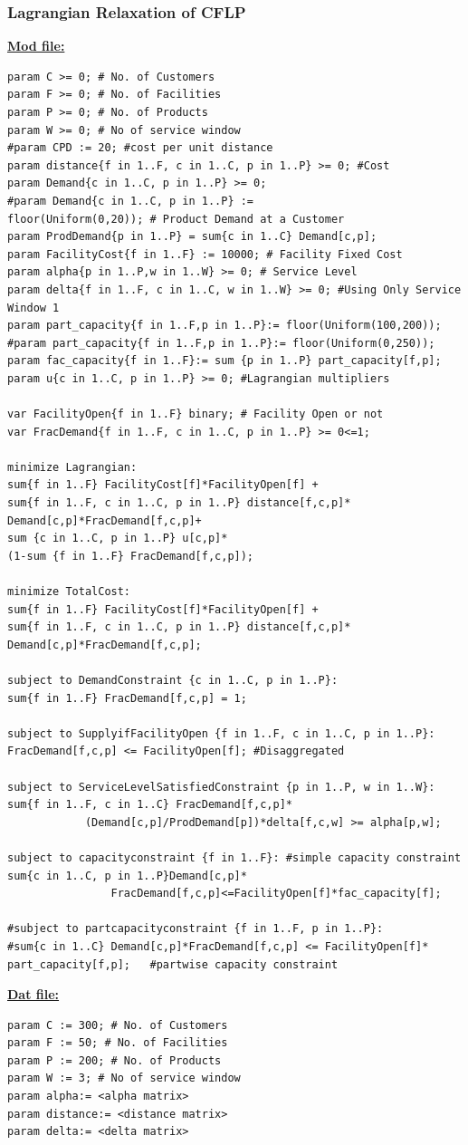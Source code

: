 \documentclass[12pt]{article}
\numberwithin{equation}{section}
\begin{document}
\subsubsection{Lagrangian Relaxation of CFLP}
\textbf{\underline{Mod file:}}
\begin{verbatim}
param C >= 0; # No. of Customers
param F >= 0; # No. of Facilities
param P >= 0; # No. of Products
param W >= 0; # No of service window
#param CPD := 20; #cost per unit distance
param distance{f in 1..F, c in 1..C, p in 1..P} >= 0; #Cost
param Demand{c in 1..C, p in 1..P} >= 0;
#param Demand{c in 1..C, p in 1..P} := 
floor(Uniform(0,20)); # Product Demand at a Customer
param ProdDemand{p in 1..P} = sum{c in 1..C} Demand[c,p];
param FacilityCost{f in 1..F} := 10000; # Facility Fixed Cost
param alpha{p in 1..P,w in 1..W} >= 0; # Service Level
param delta{f in 1..F, c in 1..C, w in 1..W} >= 0; #Using Only Service Window 1
param part_capacity{f in 1..F,p in 1..P}:= floor(Uniform(100,200));
#param part_capacity{f in 1..F,p in 1..P}:= floor(Uniform(0,250));
param fac_capacity{f in 1..F}:= sum {p in 1..P} part_capacity[f,p];
param u{c in 1..C, p in 1..P} >= 0; #Lagrangian multipliers

var FacilityOpen{f in 1..F} binary; # Facility Open or not
var FracDemand{f in 1..F, c in 1..C, p in 1..P} >= 0<=1;

minimize Lagrangian:
sum{f in 1..F} FacilityCost[f]*FacilityOpen[f] + 
sum{f in 1..F, c in 1..C, p in 1..P} distance[f,c,p]*
Demand[c,p]*FracDemand[f,c,p]+
sum {c in 1..C, p in 1..P} u[c,p]*
(1-sum {f in 1..F} FracDemand[f,c,p]);

minimize TotalCost:
sum{f in 1..F} FacilityCost[f]*FacilityOpen[f] + 
sum{f in 1..F, c in 1..C, p in 1..P} distance[f,c,p]*
Demand[c,p]*FracDemand[f,c,p];

subject to DemandConstraint {c in 1..C, p in 1..P}:
sum{f in 1..F} FracDemand[f,c,p] = 1;

subject to SupplyifFacilityOpen {f in 1..F, c in 1..C, p in 1..P}: 
FracDemand[f,c,p] <= FacilityOpen[f]; #Disaggregated

subject to ServiceLevelSatisfiedConstraint {p in 1..P, w in 1..W}:
sum{f in 1..F, c in 1..C} FracDemand[f,c,p]*
            (Demand[c,p]/ProdDemand[p])*delta[f,c,w] >= alpha[p,w];

subject to capacityconstraint {f in 1..F}: #simple capacity constraint
sum{c in 1..C, p in 1..P}Demand[c,p]*
                FracDemand[f,c,p]<=FacilityOpen[f]*fac_capacity[f];

#subject to partcapacityconstraint {f in 1..F, p in 1..P}: 
#sum{c in 1..C} Demand[c,p]*FracDemand[f,c,p] <= FacilityOpen[f]*
part_capacity[f,p];   #partwise capacity constraint
\end{verbatim}
\textbf{\underline{Dat file:}}
\begin{verbatim}
param C := 300; # No. of Customers
param F := 50; # No. of Facilities
param P := 200; # No. of Products
param W := 3; # No of service window
param alpha:= <alpha matrix>
param distance:= <distance matrix>
param delta:= <delta matrix>
\end{verbatim}
\end{document}
